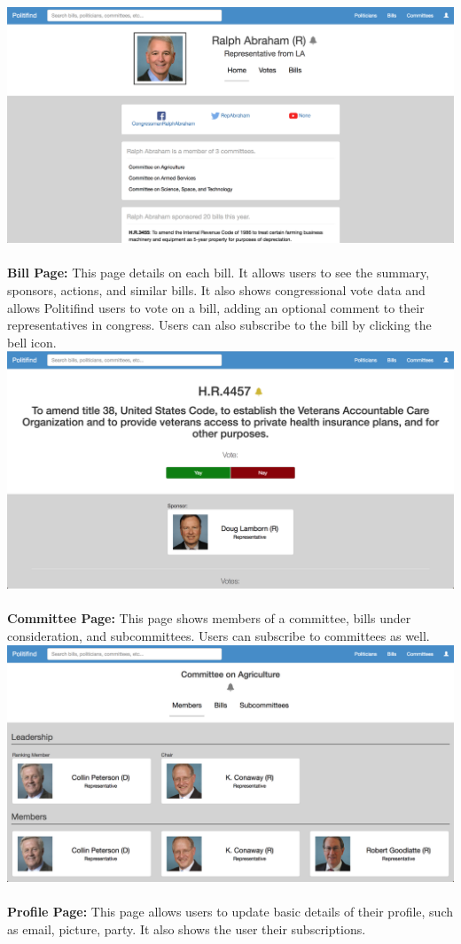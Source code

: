 \documentclass{article}
\begin{document}
\includegraphics[width=6in]{politician}\\\\
\textbf{Bill Page:} This page details on each bill.  It allows users to see the summary, sponsors, actions, and similar bills.  It also shows congressional vote data and allows Politifind users to vote on a bill, adding an optional comment to their representatives in congress. Users can also subscribe to the bill by clicking the bell icon. \\

\includegraphics[width=6in]{bill}\\\\
\textbf{Committee Page:} This page shows members of a committee, bills under consideration, and subcommittees.  Users can subscribe to committees as well. \\

\includegraphics[width=6in]{committee}\\\\
\textbf{Profile Page:} This page allows users to update basic details of their profile, such as email, picture, party.  It also shows the user their subscriptions. \\
\end{document}
